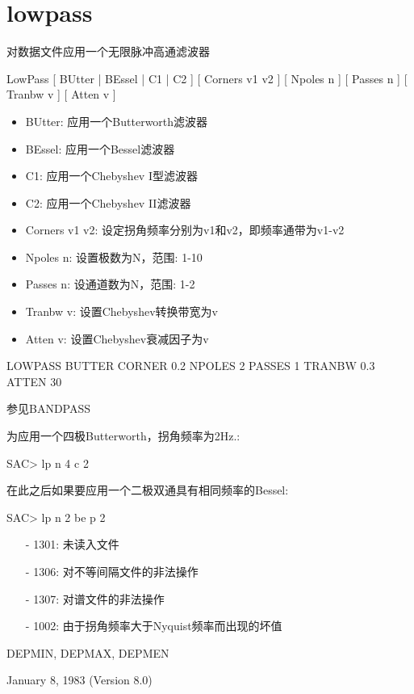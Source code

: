 \section{lowpass}
\label{cmd:lowpass}

对数据文件应用一个无限脉冲高通滤波器

LowPass [ BUtter | BEssel | C1 | C2 ] [ Corners v1 v2 ] [ Npoles n ] [ Passes n ] [ Tranbw v ] [ Atten v ]

\begin{itemize}
\item BUtter: 应用一个Butterworth滤波器
\item BEssel: 应用一个Bessel滤波器
\item C1: 应用一个Chebyshev I型滤波器
\item C2: 应用一个Chebyshev II滤波器
\item Corners v1 v2: 设定拐角频率分别为v1和v2，即频率通带为v1-v2
\item Npoles n: 设置极数为N，范围: 1-10
\item Passes n: 设通道数为N，范围: 1-2
\item Tranbw v: 设置Chebyshev转换带宽为v
\item Atten v: 设置Chebyshev衰减因子为v
\end{itemize}

LOWPASS BUTTER CORNER 0.2 NPOLES 2 PASSES 1 TRANBW 0.3 ATTEN 30

参见BANDPASS

为应用一个四极Butterworth，拐角频率为2Hz.:
\begin{SACCode}
SAC> lp n 4 c 2
\end{SACCode}
在此之后如果要应用一个二极双通具有相同频率的Bessel:
\begin{SACCode}
SAC> lp n 2 be p 2
\end{SACCode}

\begin{itemize}
\item[-]1301: 未读入文件
\item[-]1306: 对不等间隔文件的非法操作
\item[-]1307: 对谱文件的非法操作
\item[-]1002: 由于拐角频率大于Nyquist频率而出现的坏值
\end{itemize}

DEPMIN, DEPMAX, DEPMEN

January 8, 1983 (Version 8.0)
